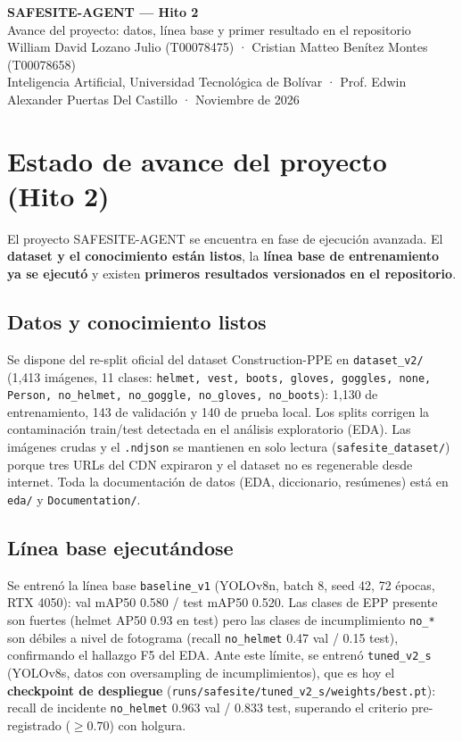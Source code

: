 \documentclass[10pt,letterpaper]{article}
\begin{document}
\begin{center}
{\large\bfseries SAFESITE-AGENT --- Hito 2\\[2pt]}
{\small Avance del proyecto: datos, línea base y primer resultado en el repositorio\\[4pt]}
{\small William David Lozano Julio (T00078475) · Cristian Matteo Benítez Montes (T00078658)\\
Inteligencia Artificial, Universidad Tecnológica de Bolívar · Prof. Edwin Alexander Puertas Del Castillo · Noviembre de 2026}
\end{center}

\vspace{2pt}

\section{Estado de avance del proyecto (Hito 2)}

El proyecto SAFESITE-AGENT se encuentra en fase de ejecución avanzada. El \textbf{dataset y el conocimiento están listos}, la \textbf{línea base de entrenamiento ya se ejecutó} y existen \textbf{primeros resultados versionados en el repositorio}.

\subsection{Datos y conocimiento listos}
Se dispone del re-split oficial del dataset Construction-PPE en \texttt{dataset\_v2/} (1,413 imágenes, 11 clases: \texttt{helmet, vest, boots, gloves, goggles, none, Person, no\_helmet, no\_goggle, no\_gloves, no\_boots}): 1,130 de entrenamiento, 143 de validación y 140 de prueba local. Los splits corrigen la contaminación train/test detectada en el análisis exploratorio (EDA). Las imágenes crudas y el \texttt{.ndjson} se mantienen en solo lectura (\texttt{safesite\_dataset/}) porque tres URLs del CDN expiraron y el dataset no es regenerable desde internet. Toda la documentación de datos (EDA, diccionario, resúmenes) está en \texttt{eda/} y \texttt{Documentation/}.

\subsection{Línea base ejecutándose}
Se entrenó la línea base \texttt{baseline\_v1} (YOLOv8n, batch 8, seed 42, 72 épocas, RTX 4050): val mAP50 0.580 / test mAP50 0.520. Las clases de EPP presente son fuertes (helmet AP50 0.93 en test) pero las clases de incumplimiento \texttt{no\_*} son débiles a nivel de fotograma (recall \texttt{no\_helmet} 0.47 val / 0.15 test), confirmando el hallazgo F5 del EDA. Ante este límite, se entrenó \texttt{tuned\_v2\_s} (YOLOv8s, datos con oversampling de incumplimientos), que es hoy el \textbf{checkpoint de despliegue} (\texttt{runs/safesite/tuned\_v2\_s/weights/best.pt}): recall de incidente \texttt{no\_helmet} 0.963 val / 0.833 test, superando el criterio pre-registrado ($\geq 0.70$) con holgura.
\end{document}

